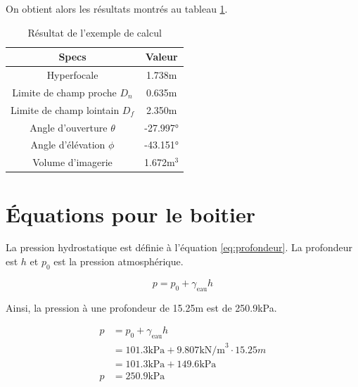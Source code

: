 On obtient alors les résultats montrés au tableau \ref{t:resultat_calcul_camera_custom}.
\begin{table}[!htb]
\footnotesize
\centering
    \begin{tabular}{|c|c|}
    \hline
    Specs & Valeur\\
    \hline\hline
    Hyperfocale & 1.738m\\
    Limite de champ proche $D_n$ & 0.635m\\
    Limite de champ lointain $D_f$ & 2.350m\\
    Angle d'ouverture $\theta$ & -27.997°\\
    Angle d'élévation $\phi$ & -43.151°\\
    Volume d'imagerie & 1.672m$^3$\\
    \hline
    \end{tabular}
\caption{Résultat de l'exemple de calcul}
\label{t:resultat_calcul_camera_custom}
\end{table}


\chapter{Équations pour le boitier}

La pression hydrostatique est définie à l'équation \ref{eq:profondeur}. La profondeur est $h$ et $p_0$ est la pression atmosphérique.

\begin{equation}
    p = p_0 +\gamma_\text{eau} h
    \label{eq:profondeur}
\end{equation}

Ainsi, la pression à une profondeur de 15.25m est de 250.9kPa.

\begin{align}
    p &= p_0 +\gamma_\text{eau} h\\
    &= 101.3\text{kPa} + 9.807\text{kN/m}^3 \cdot 15.25m\\
    &= 101.3\text{kPa} + 149.6\text{kPa}\\
    p &= 250.9\text{kPa}
\end{align}




